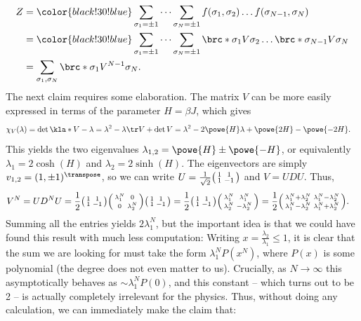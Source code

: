 \documentclass[english, parskip=full]{scrartcl}
\newcommand{\note}[1]{\bgroup\color{black!30!blue}#1\egroup}
\newcommand{\comment}[1]{\bgroup\color{black!30!blue}#1 \egroup}
\begin{document}
\begin{align}
Z &= \note{\sum_{\sigma_1=\pm 1} \dots \sum_{\sigma_N=\pm 1} f(\sigma_1,\sigma_{2}) \dots f(\sigma_{N-1}, \sigma_N)} \\
&= \note{\sum_{\sigma_1=\pm 1} \dots \sum_{\sigma_N=\pm 1} \brc*{\sigma_1}{V}{\sigma_2}\dots \brc*{\sigma_{N-1}}{V}{\sigma_N}} \\
&= \sum_{\sigma_1,\sigma_N} \brc*{\sigma_1}{V^{N-1}}{\sigma_N}.
\end{align}
\comment{The next claim requires some elaboration.
The matrix $V$ can be more easily expressed in terms of the parameter $H=\beta J$, which gives
\begin{align}
\chi_V(\lambda) &= \det\kla*{V - \lambda} = \lambda^2 - \lambda \tr V + \det V = \lambda^2 - 2\powe{H}\lambda + \powe{2H} - \powe{-2H}.
\end{align}
This yields the two eigenvalues $\lambda_{1,2} = \powe{H} \pm \powe{-H}$, or equivalently $\lambda_1 = 2\cosh(H)$ and $\lambda_2 = 2\sinh(H)$.
The eigenvectors are simply $v_{1,2} = (1, \pm 1)^\transpose$, so we can write $U=\frac{1}{\sqrt{2}} \begin{psmallmatrix} 1 & 1 \\ 1 & -1 \end{psmallmatrix}$ and $V=UDU$.
Thus,
\begin{align}
V^N &= UD^NU = \frac{1}{2} \begin{psmallmatrix} 1 & 1 \\ 1 & -1 \end{psmallmatrix} \begin{psmallmatrix} \lambda_1^N & 0 \\ 0 & \lambda_2^N \end{psmallmatrix} \begin{psmallmatrix} 1 & 1 \\ 1 & -1 \end{psmallmatrix} = \frac{1}{2}\begin{psmallmatrix} 1 & 1 \\ 1 & -1 \end{psmallmatrix} \begin{psmallmatrix} \lambda_1^N & \lambda_1^N \\ \lambda_2^N & -\lambda_2^N \end{psmallmatrix} = \frac{1}{2} \begin{psmallmatrix} \lambda_1^N + \lambda_2^N & \lambda_1^N - \lambda_2^N \\ \lambda_1^N - \lambda_2^N & \lambda_1^N + \lambda_2^N \end{psmallmatrix}.
\end{align}
Summing all the entries yields $2\lambda_1^N$, but the important idea is that we could have found this result with much less computation:
Writing $x = \frac{\lambda_2}{\lambda_1} \le 1$, it is clear that the sum we are looking for must take the form $\lambda_1^N P(x^N)$, where $P(x)$ is some polynomial (the degree does not even matter to us).
Crucially, as $N\rightarrow \infty$ this asymptotically behaves as $\sim \lambda_1^N P(0)$, and this constant -- which turns out to be 2 -- is actually completely irrelevant for the physics.
Thus, without doing any calculation, we can immediately make the claim that:}
\end{document}
